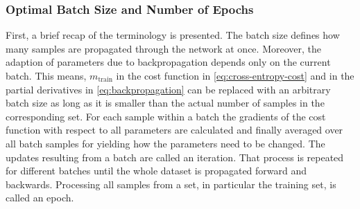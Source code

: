 \subsubsection{Optimal Batch Size and Number of Epochs}
\label{sec:improving-performance-batch-size}
First, a brief recap of the terminology is presented.
The batch size defines how many samples are propagated through the network at once.
Moreover, the adaption of parameters due to backpropagation depends only on the current batch.
This means, $m_{\text{train}}$ in the cost function in \eqref{eq:cross-entropy-cost} and in the partial derivatives in \eqref{eq:backpropagation} can be replaced with an arbitrary batch size as long as it is smaller than the actual number of samples in the corresponding set.
For each sample within a batch the gradients of the cost function with respect to all parameters are calculated and finally averaged over all batch samples for yielding how the parameters need to be changed.
The updates resulting from a batch are called an iteration.
That process is repeated for different batches until the whole dataset is propagated forward and backwards.
Processing all samples from a set, in particular the training set, is called an epoch.

